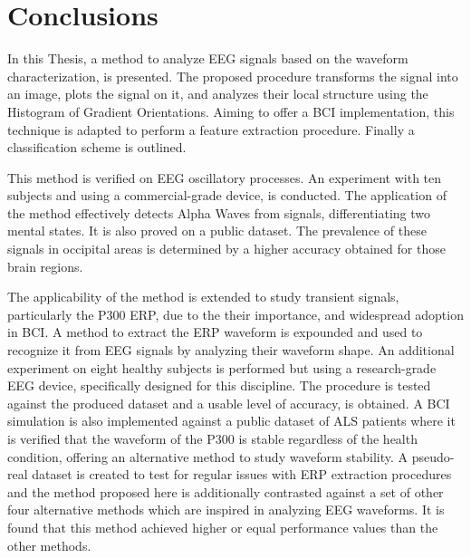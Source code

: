 \section{Conclusions}


In this Thesis, a method to analyze EEG signals based on the waveform characterization, is presented. The proposed procedure transforms the signal into an image, plots the signal on it, and analyzes their local structure using the Histogram of Gradient Orientations.   Aiming to offer a BCI implementation, this technique is adapted to perform a feature extraction procedure.  Finally a classification scheme is outlined.

This method is verified on EEG oscillatory processes.  An experiment with ten subjects and using a commercial-grade device, is conducted.  The application of the method effectively detects Alpha Waves from signals, differentiating two mental states.  It is also proved on a public dataset.  The prevalence of these signals in occipital areas is determined by a higher accuracy obtained for those brain regions.

The applicability of the method is extended to study transient signals, particularly the P300 ERP,  due to the their importance, and widespread adoption in BCI.  A method to  extract the ERP waveform is expounded and used to recognize it from EEG signals by analyzing their waveform shape.  An additional experiment on eight healthy subjects is performed but using a research-grade EEG device, specifically designed for this discipline.  The procedure is tested against the produced dataset and a usable level of accuracy, is obtained.  A BCI simulation is also implemented against a public dataset of ALS patients where it is verified that the waveform of the P300 is stable regardless of the health condition, offering an alternative method to study waveform stability.  A pseudo-real dataset is created to test for regular issues with ERP extraction procedures and the method proposed here is additionally contrasted against a set of other four alternative methods which are inspired in analyzing EEG waveforms.  It is found that this method achieved higher or equal performance values than the other methods.

